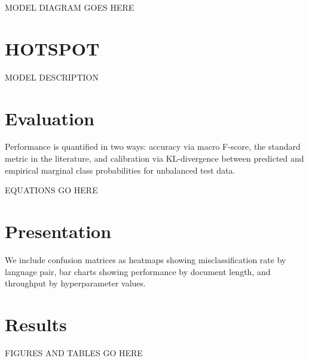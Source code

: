 \documentclass{article}
\begin{document}
\begin{figure*}[h]
  MODEL DIAGRAM GOES HERE
\end{figure*}

\section*{HOTSPOT}
MODEL DESCRIPTION

\section*{Evaluation}
Performance is quantified in two ways: accuracy via macro F-score, the standard metric in the literature, and calibration via KL-divergence between predicted and empirical marginal class probabilities for unbalanced test data.

EQUATIONS GO HERE

\section*{Presentation}
We include confusion matrices as heatmaps showing misclassification rate by language pair, bar charts showing performance by document length, and throughput by hyperparameter values.

\section*{Results}

FIGURES AND TABLES GO HERE
\end{document}
